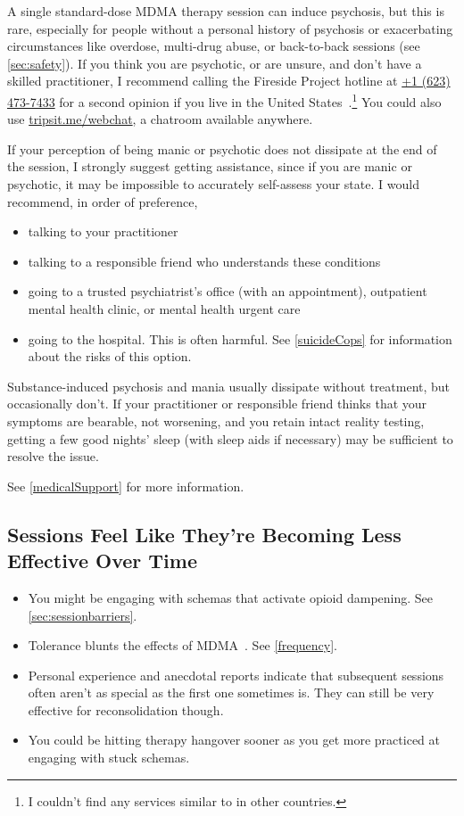 \documentclass[11pt,oneside]{book}
\let\cite\parencite
\begin{document}
A single standard-dose MDMA therapy session can induce psychosis, but this is rare, especially for people without a personal history of psychosis or exacerbating circumstances like overdose, multi-drug abuse, or back-to-back sessions (see \cref{sec:safety}). If you think you are psychotic, or are unsure, and don't have a skilled practitioner, I recommend calling the Fireside Project hotline at \href{tel:1-623-473-7433}{+1 (623) 473-7433} for a second opinion if you live in the United States~\cite{firesideProject}.\footnote{I couldn't find any services similar to \cite{firesideProject} in other countries.} You could also use \href{https://tripsit.me/webchat}{tripsit.me/webchat}, a chatroom available anywhere.

If your perception of being manic or psychotic does not dissipate at the end of the session, I strongly suggest getting assistance, since if you are manic or psychotic, it may be impossible to accurately self-assess your state. I would recommend, in order of preference,
\begin{itemize}
    \item talking to your practitioner
    \item talking to a responsible friend who understands these conditions
    \item going to a trusted psychiatrist's office (with an appointment), outpatient mental health clinic, or mental health urgent care
    \item going to the hospital. This is often harmful. See \cref{suicideCops} for information about the risks of this option.
\end{itemize}

Substance-induced psychosis and mania usually dissipate without treatment, but occasionally don't. If your practitioner or responsible friend thinks that your symptoms are bearable, not worsening, and you retain intact reality testing, getting a few good nights' sleep (with sleep aids if necessary) may be sufficient to resolve the issue.

See \cref{medicalSupport} for more information.

\subsection{Sessions Feel Like They're Becoming Less Effective Over Time}
\begin{itemize}
    \item You might be engaging with schemas that activate opioid dampening. See \cref{sec:sessionbarriers}.
    \item Tolerance blunts the effects of MDMA~\cite{farreTolerance,parrottTolerance}. See \cref{frequency}.
    \item Personal experience and anecdotal reports indicate that subsequent sessions often aren't as special as the first one sometimes is. They can still be very effective for reconsolidation though.
    \item You could be hitting therapy hangover sooner as you get more practiced at engaging with stuck schemas.
\end{itemize}
\end{document}
